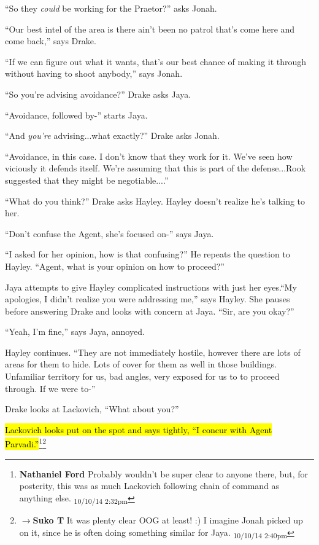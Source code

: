 ``So they \textit{could} be working for the Praetor?'' asks Jonah.

``Our best intel of the area is there ain't been no patrol that's come here and come back,'' says Drake.

``If we can figure out what it wants, that's our best chance of making it through without having to shoot anybody,'' says Jonah. 

``So you're advising avoidance?'' Drake asks Jaya.

``Avoidance, followed by-'' starts Jaya.

``And \textit{you're} advising...what exactly?'' Drake asks Jonah.

``Avoidance, in this case.  I don't know that they work for it. We've seen how viciously it defends itself.  We're assuming that this is part of the defense...Rook suggested that they might be negotiable....'' 

``What do you think?'' Drake asks Hayley.  Hayley doesn't realize he's talking to her.

``Don't confuse the Agent, she's focused on-'' says Jaya.

``I asked for her opinion, how is that confusing?''  He repeats the question to Hayley.  ``Agent, what is your opinion on how to proceed?''

Jaya attempts to give Hayley complicated instructions with just her eyes.``My apologies, I didn't realize you were addressing me,'' says Hayley.  She pauses before answering Drake and looks with concern at Jaya.  ``Sir, are you okay?''

``Yeah, I'm fine,'' says Jaya, annoyed.

Hayley continues.  ``They are not immediately hostile, however there are lots of areas for them to hide.  Lots of cover for them as well in those buildings.  Unfamiliar territory for us, bad angles, very exposed for us to to proceed through.  If we were to-''

Drake looks at Lackovich, ``What about you?''

\hl{Lackovich looks put on the spot and says tightly, ``I concur with Agent Parvadi.''}\footnote{\textbf{Nathaniel Ford }Probably wouldn't be super clear to anyone there, but, for posterity, this was as much Lackovich following chain of command as anything else. \textsubscript{10/10/14 2:32pm}}\footnote{$\rightarrow$\textbf{Suko T }It was plenty clear OOG at least! :) I imagine Jonah picked up on it, since he is often doing something similar for Jaya. \textsubscript{10/10/14 2:40pm}}

